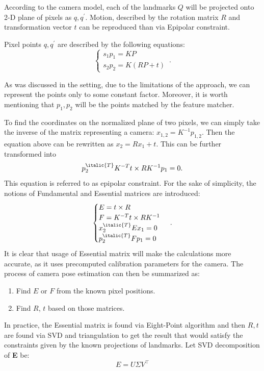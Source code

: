 According to the camera model, each of the landmarks $Q$ will be projected onto 2-D plane of pixels as $q, q^{\prime}$. Motion, described by the rotation matrix $R$ and transformation vector $t$ can be reproduced than via Epipolar constraint. 

Pixel points $q, q^{\prime}$ are described by the following equations:
\begin{equation}
    \begin{cases}
      s_{1} p_{1} = K P\\
      s_{2} p_{2} = K(RP + t)
    \end{cases}\,.
\end{equation}

As was discussed in the setting, due to the limitations of the approach, we can represent the points only to some constant factor. Moreover, it is worth mentioning that $p_{1}, p_{2}$ will be the points matched by the feature matcher.

To find the coordinates on the normalized plane of two pixels, we can simply take the inverse of the matrix representing a camera:
$x_{1, 2} = K^{-1}p_{1, 2}.$ Then the equation above can be rewritten as $x_{2} = Rx_{1} + t.$ This can be further transformed into $$p_{2}^{\italic{T}} K^{-T} t \times R K^{-1} p_{1} = 0.$$ This equation is referred to as epipolar constraint. For the sake of simplicity, the notions of Fundamental and Essential matrices are introduced:
\begin{equation}
    \begin{cases}
      E = t \times R\\
      F = K^{-T} t \times R K^{-1}\\
      x_{2}^{\italic{T}} E x_{1} = 0\\
      p_{2}^{\italic{T}} F p_{1} = 0
    \end{cases}\,.
\end{equation}
It is clear that usage of Essential matrix will make the calculations more accurate, as it uses precomputed calibration parameters for the camera. 
The process of camera pose estimation can then be summarized as:
\begin{enumerate}
    \item Find $E$ or $F$ from the known pixel positions.
    \item Find $R$, $t$ based on those matrices.
\end{enumerate}

In practice, the Essential matrix is found via Eight-Point algorithm and then $R, t$ are found via SVD and triangulation to get the result that would satisfy the constraints given by the known projections of landmarks.
Let SVD decomposition of \textbf{E} be:
$$
E = U \Sigma V^\top
$$

